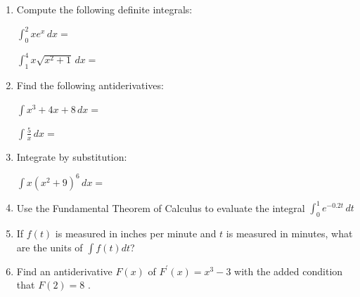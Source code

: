 \documentclass[12pt]{amsart}
\begin{document}
\begin{enumerate}
		\item %
		
		Compute the following definite integrals:
		\vspace{,2in}
		
		$\displaystyle \int_0^2 xe^x\, dx =$          \underline{\hspace {1in}}
		
		\vspace{.3in}
		
		$\displaystyle\int_1^4x\sqrt{x^2+1}\, dx=$       \underline{\hspace {1in}}
		
		\vspace{.3in}
		
		\item %
		
		Find the following antiderivatives:
		
		
		$\int x^3+4x+8\, dx=$          \underline{\hspace {1in}}
		
		\vspace{.3in}
		
		$\int\frac{5}{x}\,dx=$       \underline{\hspace {1in}}
		
		\vspace{.3in}
		
		\item %
		Integrate by substitution:
		
		$\int x(x^2+9)^6\, dx=$       \underline{\hspace {1in}}
		
		\vspace{.5in}  

\item %

Use the Fundamental Theorem of Calculus to evaluate the integral
$\displaystyle \int_0^1e^{-0.2t}\, dt$       		
		\vspace{.5in}
		
	\item %
	
	If $f(t)$ is measured in inches per minute and $t$ is measured in minutes, what are the units of $\int f(t)dt$?     \underline{\hspace {1in}}
		
		\vspace{.5in}

	
		
		\item %
		
		Find an antiderivative $F(x)$ of  $F^{\prime}(x)=x^3-3$  with
the added condition that $F(2)=8$ .
		
		\vspace{1in}


\end{enumerate}
\end{document}
